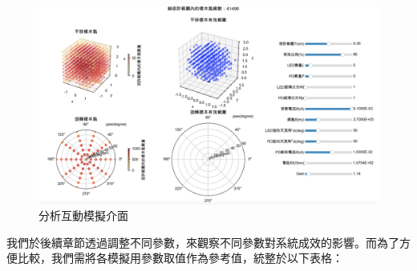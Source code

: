 \begin{figure}[htpb]
    \centering
    \includegraphics[width=15cm]{ch4pic/analysis_interactive.png}
    \caption{分析互動模擬介面}
    \label{pic:analysis_interactive}
\end{figure}

我們於後續章節透過調整不同參數，來觀察不同參數對系統成效的影響。而為了方便比較，我們需將各模擬用參數取值作為參考值，統整於以下表格：

